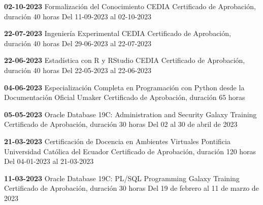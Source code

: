 
\begin{levent}
    \cvevent
	{\textbf{02-10-2023}}
	{Formalización del Conocimiento}
	{CEDIA}
	{Certificado de Aprobación, duración 40 horas}
	{Del 11-09-2023 al 02-10-2023}
\end{levent}


\begin{devent}
    \cvevent
	{\textbf{22-07-2023}}
	{Ingeniería Experimental}
	{CEDIA}
	{Certificado de Aprobación, duración 40 horas}
	{Del 29-06-2023 al 22-07-2023}
\end{devent}

\begin{levent}
    \cvevent
	{\textbf{22-06-2023}}
	{Estadística con R y RStudio}
	{CEDIA}
	{Certificado de Aprobación, duración 40 horas}
	{Del 22-05-2023 al 22-06-2023}
\end{levent}

\begin{devent}
    \cvevent
	{\textbf{04-06-2023}}
	{Especialización Completa en Programación con Python desde la Documentación Oficial}
	{Umaker}
	{Certificado de Aprobación, duración 65 horas}
	{}
\end{devent}



\begin{devent}
    \cvevent
	{\textbf{05-05-2023}}
	{Oracle Database 19C: Administration and Security}
	{Galaxy Training}
	{Certificado de Aprobación, duración 30 horas}
	{Del 02 al 30 de abril de 2023}
\end{devent}

\begin{devent}
    \cvevent
	{\textbf{21-03-2023}}
	{Certificación de Docencia en Ambientes Virtuales}
	{Pontificia Universidad Católica del Ecuador}
	{Certificado de Aprobación, duración 120 horas}
	{Del 04-01-2023 al 21-03-2023}
\end{devent}

\begin{levent}
    \cvevent
	{\textbf{11-03-2023}}
	{Oracle Database 19C: PL/SQL Programming}
	{Galaxy Training}
	{Certificado de Aprobación, duración 30 horas}
	{Del 19 de febrero al 11 de marzo de 2023}
\end{levent}

